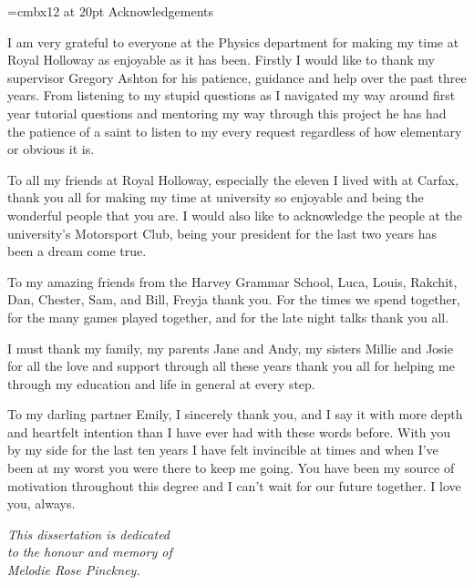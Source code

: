 \font\myfont=cmbx12 at 20pt
\Large
{\myfont Acknowledgements}

I am very grateful to everyone at the Physics department for making my time at Royal Holloway as enjoyable as it has been. Firstly I would like to thank my supervisor Gregory Ashton for his patience, guidance and help over the past three years. From listening to my stupid questions as I navigated my way around first year tutorial questions and mentoring my way through this project he has had the patience of a saint to listen to my every request regardless of how elementary or obvious it is.

To all my friends at Royal Holloway, especially the eleven I lived with at Carfax, thank you all for making my time at university so enjoyable and being the wonderful people that you are. I would also like to acknowledge the people at the university's Motorsport Club, being your president for the last two years has been a dream come true. 

To my amazing friends from the Harvey Grammar School, Luca, Louis, Rakchit, Dan, Chester, Sam, and Bill, Freyja thank you. For the times we spend together, for the many games played together, and for the late night talks thank you all.

I must thank my family, my parents Jane and Andy, my sisters Millie and Josie for all the love and support through all these years thank you all for helping me through my education and life in general at every step.

To my darling partner Emily, I sincerely thank you, and I say it with more depth and heartfelt intention than I have ever had with these words before. With you by my side for the last ten years I have felt invincible at times and when I've been at my worst you were there to keep me going. You have been my source of motivation throughout this degree and I can't wait for our future together. I love you, always.

\newpage


\begin{center}
    \emph{This dissertation is dedicated \\ to the honour and memory of \\ Melodie Rose Pinckney.}
\end{center}

\restoregeometry